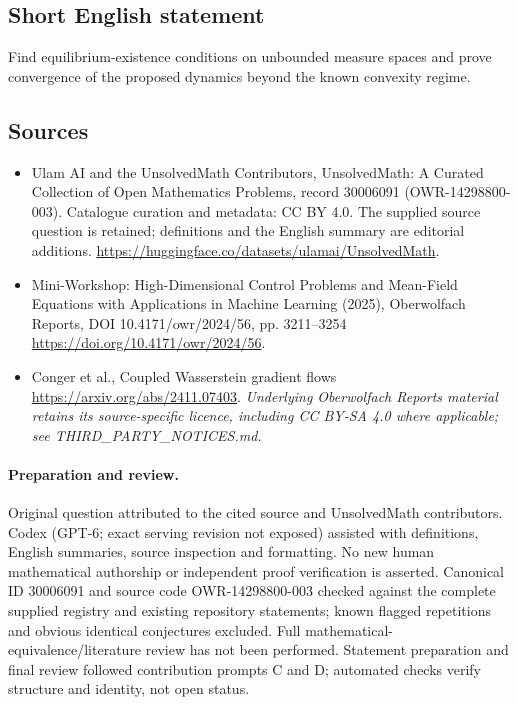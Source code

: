 \documentclass[11pt]{article}
\begin{document}
\subsection{Short English statement}
Find equilibrium-existence conditions on unbounded measure spaces and prove convergence of the proposed dynamics beyond the known convexity regime.
\subsection{Sources}
\begin{itemize}
\item[\hypertarget{source:30006091:1}{S1}] Ulam AI and the UnsolvedMath Contributors, UnsolvedMath: A Curated Collection of Open Mathematics Problems, record 30006091 (OWR-14298800-003). Catalogue curation and metadata: CC BY 4.0. The supplied source question is retained; definitions and the English summary are editorial additions.
\url{https://huggingface.co/datasets/ulamai/UnsolvedMath}.
\item[\hypertarget{source:30006091:2}{S2}] Mini-Workshop: High-Dimensional Control Problems and Mean-Field Equations with Applications in Machine Learning (2025), Oberwolfach Reports, DOI 10.4171/owr/2024/56, pp. 3211--3254
\url{https://doi.org/10.4171/owr/2024/56}.
\item[\hypertarget{source:30006091:3}{S3}] Conger et al., Coupled Wasserstein gradient flows
\url{https://arxiv.org/abs/2411.07403}.
\textit{Underlying Oberwolfach Reports material retains its source-specific licence, including CC BY-SA 4.0 where applicable; see THIRD\_PARTY\_NOTICES.md.}
\end{itemize}
\paragraph{Preparation and review.}
Original question attributed to the cited source and UnsolvedMath contributors. Codex (GPT-6; exact serving revision not exposed) assisted with definitions, English summaries, source inspection and formatting. No new human mathematical authorship or independent proof verification is asserted. Canonical ID 30006091 and source code OWR-14298800-003 checked against the complete supplied registry and existing repository statements; known flagged repetitions and obvious identical conjectures excluded. Full mathematical-equivalence/literature review has not been performed. Statement preparation and final review followed contribution prompts C and D; automated checks verify structure and identity, not open status.
\label{end:30006091}
\end{document}
